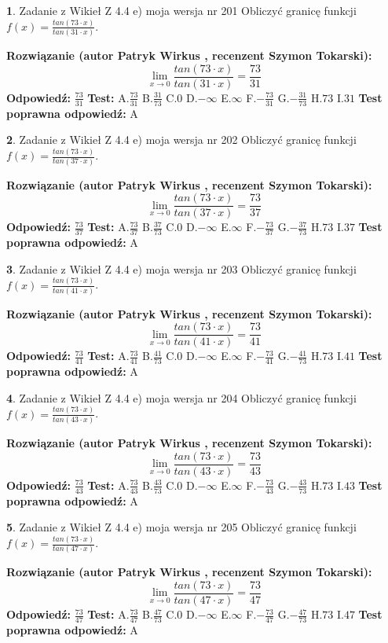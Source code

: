\documentclass[12pt, a4paper]{article}
\theoremstyle{definition} %
\newtheorem{zad}{}
\newcommand{\zadStart}[1]{\begin{zad}#1\newline}
\newcommand{\zadStop}{\end{zad}}
\newcommand{\rozwStart}[2]{\noindent \textbf{Rozwiązanie (autor #1 , recenzent #2): }\newline}
\newcommand{\rozwStop}{\newline}
\newcommand{\odpStart}{\noindent \textbf{Odpowiedź:}\newline}
\newcommand{\odpStop}{\newline}
\newcommand{\testStart}{\noindent \textbf{Test:}\newline}
\newcommand{\testStop}{\newline}
\newcommand{\kluczStart}{\noindent \textbf{Test poprawna odpowiedź:}\newline}
\newcommand{\kluczStop}{\newline}
\begin{document}
\zadStart{Zadanie z Wikieł Z 4.4 e) moja wersja nr 201}
Obliczyć granicę funkcji $f(x)=\frac{tan(73\cdot x)}{tan(31\cdot x)}$.
\zadStop
\rozwStart{Patryk Wirkus}{Szymon Tokarski}
$$\lim\limits_{x\to 0}\frac{tan(73\cdot x)}{tan(31\cdot x)}=
\frac{73}{31}$$
\rozwStop
\odpStart
$\frac{73}{31}$
\odpStop
\testStart
A.$\frac{73}{31}$
B.$\frac{31}{73}$
C.$0$
D.$-\infty$
E.$\infty$
F.$-\frac{73}{31}$
G.$-\frac{31}{73}$
H.$73$
I.$31$
\testStop
\kluczStart
A
\kluczStop



\zadStart{Zadanie z Wikieł Z 4.4 e) moja wersja nr 202}
Obliczyć granicę funkcji $f(x)=\frac{tan(73\cdot x)}{tan(37\cdot x)}$.
\zadStop
\rozwStart{Patryk Wirkus}{Szymon Tokarski}
$$\lim\limits_{x\to 0}\frac{tan(73\cdot x)}{tan(37\cdot x)}=
\frac{73}{37}$$
\rozwStop
\odpStart
$\frac{73}{37}$
\odpStop
\testStart
A.$\frac{73}{37}$
B.$\frac{37}{73}$
C.$0$
D.$-\infty$
E.$\infty$
F.$-\frac{73}{37}$
G.$-\frac{37}{73}$
H.$73$
I.$37$
\testStop
\kluczStart
A
\kluczStop



\zadStart{Zadanie z Wikieł Z 4.4 e) moja wersja nr 203}
Obliczyć granicę funkcji $f(x)=\frac{tan(73\cdot x)}{tan(41\cdot x)}$.
\zadStop
\rozwStart{Patryk Wirkus}{Szymon Tokarski}
$$\lim\limits_{x\to 0}\frac{tan(73\cdot x)}{tan(41\cdot x)}=
\frac{73}{41}$$
\rozwStop
\odpStart
$\frac{73}{41}$
\odpStop
\testStart
A.$\frac{73}{41}$
B.$\frac{41}{73}$
C.$0$
D.$-\infty$
E.$\infty$
F.$-\frac{73}{41}$
G.$-\frac{41}{73}$
H.$73$
I.$41$
\testStop
\kluczStart
A
\kluczStop



\zadStart{Zadanie z Wikieł Z 4.4 e) moja wersja nr 204}
Obliczyć granicę funkcji $f(x)=\frac{tan(73\cdot x)}{tan(43\cdot x)}$.
\zadStop
\rozwStart{Patryk Wirkus}{Szymon Tokarski}
$$\lim\limits_{x\to 0}\frac{tan(73\cdot x)}{tan(43\cdot x)}=
\frac{73}{43}$$
\rozwStop
\odpStart
$\frac{73}{43}$
\odpStop
\testStart
A.$\frac{73}{43}$
B.$\frac{43}{73}$
C.$0$
D.$-\infty$
E.$\infty$
F.$-\frac{73}{43}$
G.$-\frac{43}{73}$
H.$73$
I.$43$
\testStop
\kluczStart
A
\kluczStop



\zadStart{Zadanie z Wikieł Z 4.4 e) moja wersja nr 205}
Obliczyć granicę funkcji $f(x)=\frac{tan(73\cdot x)}{tan(47\cdot x)}$.
\zadStop
\rozwStart{Patryk Wirkus}{Szymon Tokarski}
$$\lim\limits_{x\to 0}\frac{tan(73\cdot x)}{tan(47\cdot x)}=
\frac{73}{47}$$
\rozwStop
\odpStart
$\frac{73}{47}$
\odpStop
\testStart
A.$\frac{73}{47}$
B.$\frac{47}{73}$
C.$0$
D.$-\infty$
E.$\infty$
F.$-\frac{73}{47}$
G.$-\frac{47}{73}$
H.$73$
I.$47$
\testStop
\kluczStart
A
\kluczStop
\end{document}
